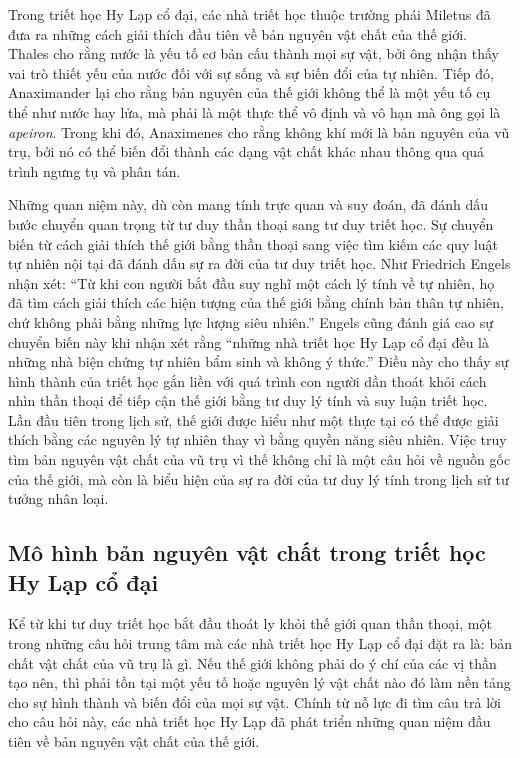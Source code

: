 \documentclass[14pt,a4paper]{extarticle}
\begin{document}
Trong triết học Hy Lạp cổ đại, các nhà triết học thuộc trường phái Miletus đã đưa ra những cách giải thích đầu tiên về bản nguyên vật chất của thế giới. Thales cho rằng nước là yếu tố cơ bản cấu thành mọi sự vật, bởi ông nhận thấy vai trò thiết yếu của nước đối với sự sống và sự biến đổi của tự nhiên. Tiếp đó, Anaximander lại cho rằng bản nguyên của thế giới không thể là một yếu tố cụ thể như nước hay lửa, mà phải là một thực thể vô định và vô hạn mà ông gọi là \emph{apeiron}. Trong khi đó, Anaximenes cho rằng không khí mới là bản nguyên của vũ trụ, bởi nó có thể biến đổi thành các dạng vật chất khác nhau thông qua quá trình ngưng tụ và phân tán.

Những quan niệm này, dù còn mang tính trực quan và suy đoán, đã đánh dấu bước chuyển quan trọng từ tư duy thần thoại sang tư duy triết học. Sự chuyển biến từ cách giải thích thế giới bằng thần thoại sang việc tìm kiếm các quy luật tự nhiên nội tại đã đánh dấu sự ra đời của tư duy triết học. Như Friedrich Engels nhận xét: ``Từ khi con người bắt đầu suy nghĩ một cách lý tính về tự nhiên, họ đã tìm cách giải thích các hiện tượng của thế giới bằng chính bản thân tự nhiên, chứ không phải bằng những lực lượng siêu nhiên.''\cite{engels} Engels cũng đánh giá cao sự chuyển biến này khi nhận xét rằng ``những nhà triết học Hy Lạp cổ đại đều là những nhà biện chứng tự nhiên bẩm sinh và không ý thức.''\cite{engels} Điều này cho thấy sự hình thành của triết học gắn liền với quá trình con người dần thoát khỏi cách nhìn thần thoại để tiếp cận thế giới bằng tư duy lý tính và suy luận triết học. Lần đầu tiên trong lịch sử, thế giới được hiểu như một thực tại có thể được giải thích bằng các nguyên lý tự nhiên thay vì bằng quyền năng siêu nhiên. Việc truy tìm bản nguyên vật chất của vũ trụ vì thế không chỉ là một câu hỏi về nguồn gốc của thế giới, mà còn là biểu hiện của sự ra đời của tư duy lý tính trong lịch sử tư tưởng nhân loại.

\subsection{Mô hình bản nguyên vật chất trong triết học Hy Lạp cổ đại}

Kể từ khi tư duy triết học bắt đầu thoát ly khỏi thế giới quan thần thoại, một trong những câu hỏi trung tâm mà các nhà triết học Hy Lạp cổ đại đặt ra là: bản chất vật chất của vũ trụ là gì. Nếu thế giới không phải do ý chí của các vị thần tạo nên, thì phải tồn tại một yếu tố hoặc nguyên lý vật chất nào đó làm nền tảng cho sự hình thành và biến đổi của mọi sự vật. Chính từ nỗ lực đi tìm câu trả lời cho câu hỏi này, các nhà triết học Hy Lạp đã phát triển những quan niệm đầu tiên về bản nguyên vật chất của thế giới.
\end{document}
